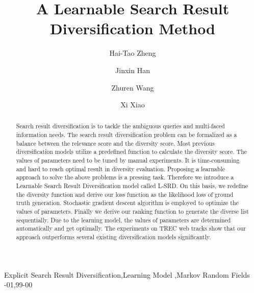 \documentclass[review]{elsarticle}
\begin{document}
	
	\begin{frontmatter}
		
		\title{A Learnable Search Result Diversification Method}
		
		
		\author[mymainaddress,htemail]{Hai-Tao Zheng}
		
		\author[mymainaddress,jxemail]{Jinxin Han}
		\author[mymainaddress,zremail]{Zhuren Wang}
		\author[mymainaddress,xxemail]{Xi Xiao}
		
		\address[mymainaddress]{Tsinghua-Southampton Web Science Laboratory, Graduate School at Shenzhen, Tsinghua University, China}
		\address[htemail]{zheng.haitao@sz.tsinghua.edu.cn}
		\address[jxemail]{hanjx16@mails.tsinghua.edu.cn}
		\address[zremail]{wang-zr14@mails.tsinghua.edu.cn}
		\address[xxemail]{xiaox@sz.tsinghua.edu.cn}


\begin{abstract}
\indent Search result diversification is to tackle the ambiguous queries and multi-faced information needs. The search result diversification problem can be formalized as a balance between the relevance score and the diversity score. Most previous diversification models utilize a predefined function to calculate the diversity score. The values of parameters need to be tuned by manual experiments. It is time-consuming and hard to reach optimal result in diversity evaluation. Proposing a learnable approach to solve the above problems is a pressing task. Therefore we introduce a Learnable Search Result Diversification model called L-SRD. On this basis, we redefine the diversity function and derive our loss function as the likelihood loss of ground truth generation. Stochastic gradient descent algorithm is employed to optimize the values of parameters. Finally we derive our ranking function to generate the diverse list sequentially. Due to the learning model, the values of parameters are determined automatically and get optimally. The experiments on TREC web tracks show that our approach outperforms several existing diversification models significantly.
\end{abstract}

\begin{keyword}
Explicit Search Result Diversification\sep Learning Model \sep Markov Random Fields
-01\sep  99-00
\end{keyword}

\end{frontmatter}
\end{document}
